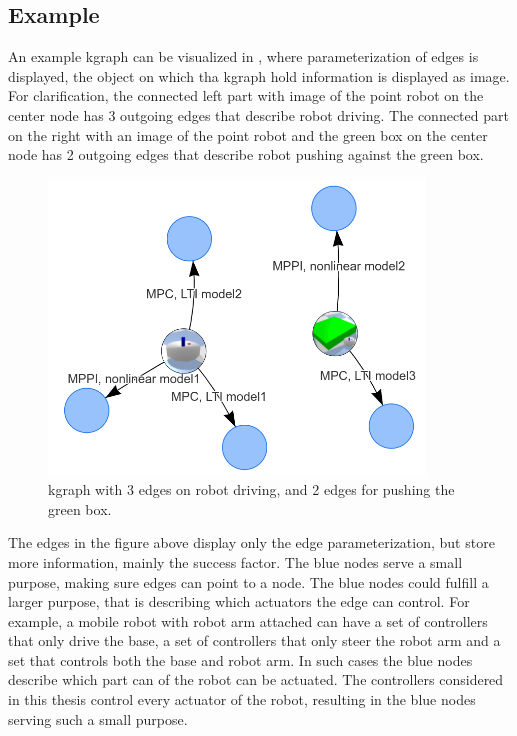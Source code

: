 \subsection{Example}%
\label{subsec:kgraph_example}
An example \ac{kgraph} can be visualized in , where parameterization of edges is displayed, the object on which tha \ac{kgraph} hold information is displayed as image. For clarification, the connected left part with image of the point robot on the center node has 3 outgoing edges that describe robot driving. The connected part on the right with an image of the point robot and the green box on the center node has 2 outgoing edges that describe robot pushing against the green box.\bs

\begin{figure}[H]
    \centering
    \includegraphics[width=10cm]{figures/proposed_method/kgraph_example}
    \caption{\ac{kgraph} with 3 edges on robot driving, and 2 edges for pushing the green box.}%
    \label{fig:kgraph_example}
\end{figure}

The edges in the figure above display only the edge parameterization, but store more information, mainly the success factor. The blue nodes serve a small purpose, making sure edges can point to a node. The blue nodes could fulfill a larger purpose, that is describing which actuators the edge can control. For example, a mobile robot with robot arm attached can have a set of controllers that only drive the base, a set of controllers that only steer the robot arm and a set that controls both the base and robot arm. In such cases the blue nodes describe which part can of the robot can be actuated. The controllers considered in this thesis control every actuator of the robot, resulting in the blue nodes serving such a small purpose.\bs
